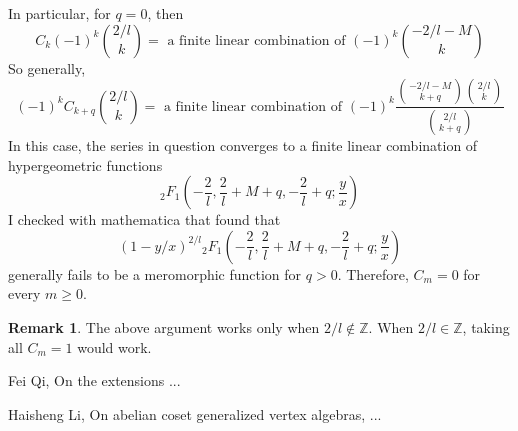 \documentclass{article}
\theoremstyle{definition}
\newtheorem{rema}[theorem]{Remark}
\newcommand{\Z}{{\mathbb Z}}
\begin{document}
In particular, for $q=0$, then 
$$C_{k}(-1)^{k} \binom{2/l}{k} = \text{ a finite linear combination of }(-1)^k \binom{-2/l-M}{k} $$
So generally, 
$$(-1)^k C_{k+q}\binom{2/l}{k} = \text{ a finite linear combination of } (-1)^k \displaystyle{\frac{\binom{-2/l-M}{k+q}\binom{2/l}{k}}{\binom{2/l}{k+q}}}$$
In this case, the series in question converges to a finite linear combination of hypergeometric functions 
$${}_2F_1\left(-\frac 2 l, \frac 2 l + M + q, - \frac 2 l + q; \frac y x\right)$$
I checked with mathematica that found that 
$$(1-y/x)^{2/l}{}_2F_1\left(-\frac 2 l, \frac 2 l + M + q, - \frac 2 l + q; \frac y x\right)$$
generally fails to be a meromorphic function for $q>0$. Therefore, $C_m = 0$ for every $m\geq 0$. 

\begin{rema}
    The above argument works only when $2/l\notin \Z$. When $2/l\in \Z$, taking all $C_m = 1$ would work. 
\end{rema}
\begin{thebibliography}{KWAK2}

 Fei Qi, On the extensions ...

 Haisheng Li, On abelian coset generalized vertex algebras, ...

\end{thebibliography}
\end{document}
